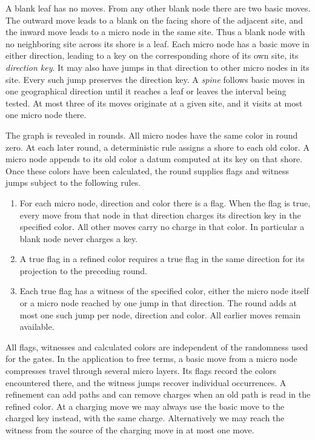 A blank leaf has no moves. From any other blank node there are two
basic moves. The outward move leads to a blank on the facing shore of
the adjacent site, and the inward move leads to a micro node in the
same site. Thus a blank node with no neighboring site across its shore
is a leaf. Each micro node has a basic move in either direction, leading
to a key on the corresponding shore of its own site, its
\emph{direction key}. It may also have jumps in that direction to
other micro nodes in its site. Every such jump preserves the direction
key. A \emph{spine} follows basic moves in one geographical direction
until it reaches a leaf or leaves the interval being tested. At most
three of its moves originate at a given site, and it visits at most
one micro node there.

The graph is revealed in rounds. All micro nodes have the same color
in round zero. At each later round, a deterministic rule assigns a
shore to each old color. A micro node appends to its old color a datum
computed at its key on that shore. Once these colors have been
calculated, the round supplies flags and witness jumps subject to the
following rules.
\begin{enumerate}
\item For each micro node, direction and color there is a flag. When
the flag is true, every move from that node in that direction charges
its direction key in the specified color. All other moves carry no
charge in that color. In particular a blank node never charges a key.
\item A true flag in a refined color requires a true flag in the same
direction for its projection to the preceding round.
\item Each true flag has a witness of the specified color, either the
micro node itself or a micro node reached by one jump in that
direction. The round adds at most one such jump per node, direction
and color. All earlier moves remain available.
\end{enumerate}
All flags, witnesses and calculated colors are independent of the
randomness used for the gates. In the application to free terms, a basic
move from a micro node compresses travel through several micro layers.
Its flags record the colors encountered there, and the witness jumps
recover individual occurrences. A refinement can add paths
and can remove charges when an old path is read in the refined color.
At a charging move we may always use the basic move to the charged key
instead, with the same charge. Alternatively we may reach the witness
from the source of the charging move in at most one move.

